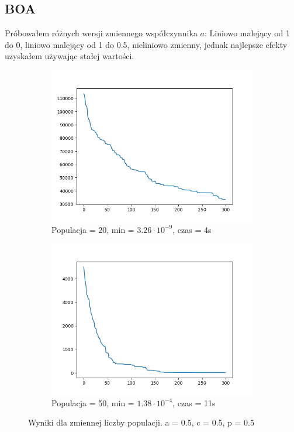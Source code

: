 \documentclass[12pt]{article}
\begin{document}
\subsection{BOA}
Próbowałem różnych wersji zmiennego współczynnika $a$: Liniowo malejący od 1 do 0, liniowo malejący od 1 do 0.5, nieliniowo zmienny, jednak najlepsze efekty uzyskałem używając stałej wartości.
\begin{figure}[H]
    \centering
    \begin{subfigure}{0.49\textwidth}
        \centering
        \includegraphics[width=\linewidth]{plots/BOA/2_best.png}
        \caption{Populacja = 20, min = $3.26\cdot 10^{-9}$, czas = 4s}
    \end{subfigure}
    \begin{subfigure}{0.49\textwidth}
        \centering
        \includegraphics[width=\linewidth]{plots/BOA/3_best.png}
        \caption{Populacja = 50, min = $1.38\cdot 10^{-4}$, czas = 11s}
    \end{subfigure}
    \caption{Wyniki dla zmiennej liczby populacji. a = 0.5, c = 0.5, p = 0.5}
\end{figure}
\end{document}
